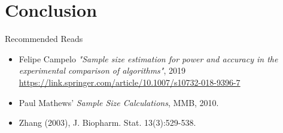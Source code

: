 \section{Conclusion}


\begin{frame}{Recommended Reads}
  \begin{itemize}
    \item Felipe Campelo \emph{"Sample size estimation for power and accuracy in the experimental comparison of algorithms"}, 2019
    \url{https://link.springer.com/article/10.1007/s10732-018-9396-7}
    \item Paul Mathews' \textit{Sample Size Calculations}, MMB, 2010.
    \item Zhang (2003), J. Biopharm. Stat. 13(3):529-538.
  \end{itemize}
\end{frame}
